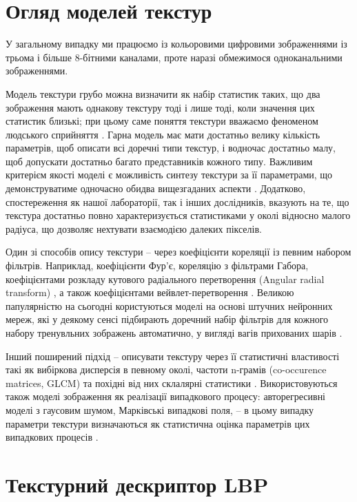 
\section{Огляд моделей текстур}\label{section1.overview}

У загальному випадку ми працюємо із кольоровими цифровими зображеннями із трьома і більше 8-бітними каналами, 
проте наразі обмежимося одноканальними зображеннями.

Модель текстури грубо можна визначити як набір статистик таких, що два зображення мають однакову текстуру тоді і лише тоді, коли значення цих статистик близькі;
при цьому саме поняття текстури вважаємо феноменом людського сприйняття \cite{julesz1981}.
Гарна модель має мати достатньо велику кількість параметрів, щоб описати всі доречні типи текстур, 
і водночас достатньо малу, щоб допускати достатньо багато представників кожного типу.
Важливим критерієм якості моделі є можливість синтезу текстури за її параметрами, 
що демонструватиме одночасно обидва вищезгаданих аспекти \cite{simoncelli1998}. 
Додатково, спостереження як нашої лабораторії, так і інших дослідників, вказують на те, що текстура достатньо повно характеризується
статистиками у околі відносно малого радіуса, що дозволяє нехтувати взаємодією далеких пікселів.

Один зі способів опису текстури -- через коефіцієнти кореляції із певним набором фільтрів. 
Наприклад, коефіцієнти Фур'є, кореляцію з фільтрами Габора, коефіцієнтами розкладу 
кутового радіального перетворення (Angular radial transform) \cite{bober2001},
а також коефіцієнтами вейвлет-перетворення \cite{portilla2000}.
Великою папулярністю на сьогодні користуються моделі на основі штучних нейронних мереж, 
які у деякому сенсі підбирають доречний набір фільтрів для кожного набору тренувльних зображень автоматично, 
у вигляді вагів прихованих шарів \cite{Wang_2018_CVPR}.

Інший поширений підхід -- описувати текстуру через її статистичні властивості такі як вибіркова дисперсія в певному околі,
частоти n-грамів (co-occurence matrices, GLCM) та похідні від них склалярні статистики \cite{belsare2015}. 
Використовуються також моделі зображення як реалізації випадкового процесу: авторегресивні моделі з гаусовим шумом, 
Марківські випадкові поля, -- в цьому випадку параметри текстури визначаються як статистична оцінка параметрів цих випадкових процесів \cite{huawudeng2004, kashyap1986}. 

\section{Текстурний дескриптор LBP}\label{section1.lbp}

